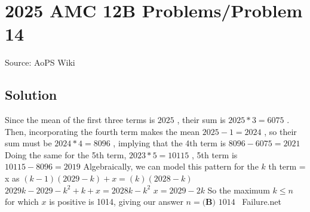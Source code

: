 \documentclass[12pt]{article}
\begin{document}
\section*{{2025 AMC 12B Problems/Problem 14}}
Source: AoPS Wiki

\subsection*{Solution}
Since the mean of the first three terms is $2025$ , their sum is $2025 * 3 = 6075$ .
Then, incorporating the fourth term makes the mean $2025-1=2024$ , so their sum must be $2024 * 4 = 8096$ , implying that the 4th term is $8096-6075=2021$ Doing the same for the 5th term, $2023 * 5= 10115$ , 5th term is $10115-8096=2019$ Algebraically, we can model this pattern for the $k$ th term = x as $(k-1)(2029-k) + x = (k)(2028-k)$ $2029k-2029-k^2+k+x=2028k-k^2$ $x=2029-2k$ So the maximum $k\le n$ for which $x$ is positive is 1014, giving our answer $n=\boxed{\textbf{(B) }1014}$ ~Failure.net
\end{document}
